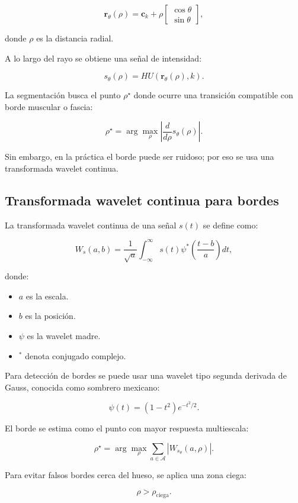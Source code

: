 \documentclass[12pt,a4paper]{article}
\begin{document}
\[
\mathbf{r}_{\theta}(\rho)
=
\mathbf{c}_k
+
\rho
\begin{bmatrix}
\cos\theta\\
\sin\theta
\end{bmatrix},
\]

donde \(\rho\) es la distancia radial.

A lo largo del rayo se obtiene una señal de intensidad:

\[
s_{\theta}(\rho)=HU(\mathbf{r}_{\theta}(\rho),k).
\]

La segmentación busca el punto \(\rho^\star\) donde ocurre una transición compatible con borde muscular o fascia:

\[
\rho^\star =
\arg\max_{\rho}
\left|
\frac{d}{d\rho}s_{\theta}(\rho)
\right|.
\]

Sin embargo, en la práctica el borde puede ser ruidoso; por eso se usa una transformada wavelet continua.

\subsection{Transformada wavelet continua para bordes}

La transformada wavelet continua de una señal \(s(t)\) se define como:

\[
W_s(a,b)
=
\frac{1}{\sqrt{a}}
\int_{-\infty}^{\infty}
s(t)
\psi^\ast\left(\frac{t-b}{a}\right)
dt,
\]

donde:

\begin{itemize}
    \item \(a\) es la escala.
    \item \(b\) es la posición.
    \item \(\psi\) es la wavelet madre.
    \item \(^\ast\) denota conjugado complejo.
\end{itemize}

Para detección de bordes se puede usar una wavelet tipo segunda derivada de Gauss, conocida como sombrero mexicano:

\[
\psi(t)=
\left(1-t^2\right)e^{-t^2/2}.
\]

El borde se estima como el punto con mayor respuesta multiescala:

\[
\rho^\star =
\arg\max_{\rho}
\sum_{a\in\mathcal{A}}
\left|
W_{s_\theta}(a,\rho)
\right|.
\]

Para evitar falsos bordes cerca del hueso, se aplica una zona ciega:

\[
\rho > \rho_{\text{ciega}}.
\]
\end{document}
